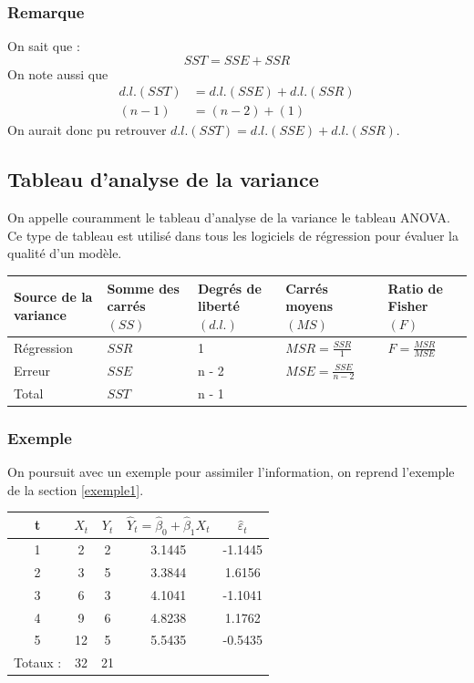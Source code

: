 \documentclass[11pt,french]{report}
\begin{document}
\subsubsection*{Remarque}
On sait que :
$$
SST = SSE + SSR
$$
On note aussi que 
\begin{align*}
d.l.(SST) &= d.l.(SSE) + d.l.(SSR) \\
(n-1) &= (n-2) + (1)
\end{align*}
On aurait donc pu retrouver $d.l.(SST) = d.l.(SSE) + d.l.(SSR)$.

\subsection{Tableau d'analyse de la variance}
\label{seq:anova}
On appelle couramment le tableau d'analyse de la variance le tableau ANOVA. Ce type de tableau est utilisé dans tous les logiciels de régression pour évaluer la qualité d'un modèle.

\bigskip
\begin{tabularx}{\linewidth}{|X|X|X|X|X|}
\hline
\rowcolor{backcolour}
Source de la variance & Somme des carrés $(SS)$ & Degrés de liberté $(d.l.)$ & Carrés moyens $(MS)$ & Ratio de Fisher $(F)$ \\
\hline
Régression & $SSR$ & 1 & $MSR = \frac{SSR}{1}$ & $F = \frac{MSR}{MSE}$ \\
Erreur & $SSE$ & n - 2 & $ MSE = \frac{SSE}{n-2}$ & \\
\hline
Total & $SST$ & n - 1 & & \\
\hline
\end{tabularx}

\bigskip
\subsubsection*{Exemple}
On poursuit avec un exemple pour assimiler l'information, on reprend l'exemple de la section \ref{exemple1}.

\bigskip
\begin{center}
\begin{tabular}{|c|c|c|c|c|}
\hline
\rowcolor{backcolour}
t & $X_t$ & $Y_t$  & $\hat{Y}_t = \hat{\beta}_0 + \hat{\beta}_1X_t$ & $\hat{\varepsilon}_t$\\
\hline
1 & 2 & 2 & 3.1445 & -1.1445\\
2 & 3 & 5 & 3.3844 & 1.6156\\
3 & 6 & 3 & 4.1041 & -1.1041\\
4 & 9 & 6 & 4.8238 & 1.1762\\
5 & 12 & 5 & 5.5435 & -0.5435\\
\hline
Totaux : & 32 & 21 & & \\
\hline
\end{tabular}
\end{center}
\end{document}
